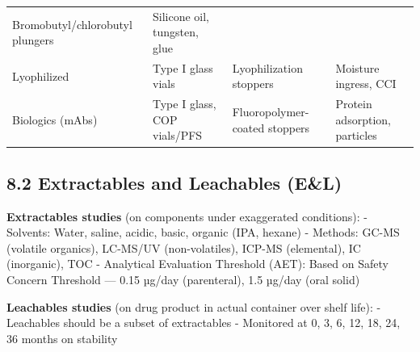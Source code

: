 \documentclass[
  11pt,
  a4paper,
]{report}
\begin{document}
\begin{longtable}[]{@{}llll@{}}
\begin{minipage}[t]{0.15\columnwidth}
Bromobutyl/chlorobutyl plungers\strut
\end{minipage} & \begin{minipage}[t]{0.32\columnwidth}\raggedright
Silicone oil, tungsten, glue\strut
\end{minipage}\tabularnewline
\begin{minipage}[t]{0.22\columnwidth}\raggedright
Lyophilized\strut
\end{minipage} & \begin{minipage}[t]{0.19\columnwidth}\raggedright
Type I glass vials\strut
\end{minipage} & \begin{minipage}[t]{0.15\columnwidth}\raggedright
Lyophilization stoppers\strut
\end{minipage} & \begin{minipage}[t]{0.32\columnwidth}\raggedright
Moisture ingress, CCI\strut
\end{minipage}\tabularnewline
\begin{minipage}[t]{0.22\columnwidth}\raggedright
Biologics (mAbs)\strut
\end{minipage} & \begin{minipage}[t]{0.19\columnwidth}\raggedright
Type I glass, COP vials/PFS\strut
\end{minipage} & \begin{minipage}[t]{0.15\columnwidth}\raggedright
Fluoropolymer-coated stoppers\strut
\end{minipage} & \begin{minipage}[t]{0.32\columnwidth}\raggedright
Protein adsorption, particles\strut
\end{minipage}\tabularnewline
\bottomrule
\end{longtable}

\hypertarget{extractables-and-leachables-el}{%
\subsection{8.2 Extractables and Leachables
(E\&L)}\label{extractables-and-leachables-el}}

\textbf{Extractables studies} (on components under exaggerated
conditions): - Solvents: Water, saline, acidic, basic, organic (IPA,
hexane) - Methods: GC-MS (volatile organics), LC-MS/UV (non-volatiles),
ICP-MS (elemental), IC (inorganic), TOC - Analytical Evaluation
Threshold (AET): Based on Safety Concern Threshold --- 0.15 µg/day
(parenteral), 1.5 µg/day (oral solid)

\textbf{Leachables studies} (on drug product in actual container over
shelf life): - Leachables should be a subset of extractables - Monitored
at 0, 3, 6, 12, 18, 24, 36 months on stability
\end{document}
